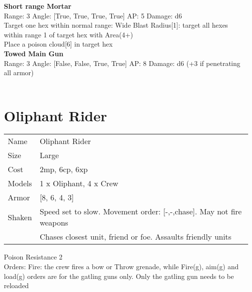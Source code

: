 {\bf Short range Mortar } \\



Range: 3  Angle: [True, True, True, True] AP: 5 Damage: d6 \\
Target one hex within normal range: Wide Blast Radius[1]: target all hexes within range 1 of target hex with Area(4+)\\ 
Place a poison cloud[6] in target hex\\ 




{\bf Towed Main Gun } \\



Range: 3  Angle: [False, False, True, True] AP: 8 Damage: d6 (+3 if penetrating all armor) \\




 
\ \\













\clearpage

\section{ Oliphant Rider }

\begin{tabular}{ll}
  Name & Oliphant Rider \\
  Size & Large\\
  Cost & 2mp, 6cp, 6xp\\
  Models & 1 x Oliphant, 4 x Crew\\
  Armor & [8, 6, 4, 3]\\
  Shaken & Speed set to slow. Movement order: [-,-,chase]. May not fire weapons\\ &Chases closest unit, friend or foe. Assaults friendly units\\
\end{tabular}

\noindent Poison Resistance 2\\ 
Orders: Fire: the crew fires a bow or Throw grenade, while Fire(g), aim(g) and load(g) orders are for the gatling guns only. Only the gatling gun needs to be reloaded\\ 


